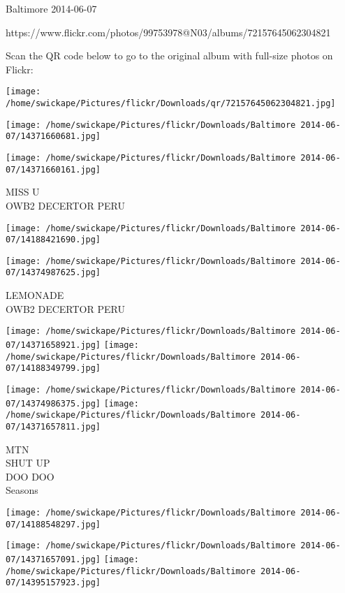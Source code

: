 \documentclass[10pt,letterpaper]{article}
\begin{document}
Baltimore 2014-06-07

https://www.flickr.com/photos/99753978@N03/albums/72157645062304821

Scan the QR code below to go to the original album with full-size photos on Flickr:

\texttt{[image: /home/swickape/Pictures/flickr/Downloads/qr/72157645062304821.jpg]}
\pagebreak

\texttt{[image: /home/swickape/Pictures/flickr/Downloads/Baltimore 2014-06-07/14371660681.jpg]}

\vspace{0.25in}
\texttt{[image: /home/swickape/Pictures/flickr/Downloads/Baltimore 2014-06-07/14371660161.jpg]}

MISS U\\
OWB2 DECERTOR PERU\\
\pagebreak

\texttt{[image: /home/swickape/Pictures/flickr/Downloads/Baltimore 2014-06-07/14188421690.jpg]}

\vspace{0.25in}
\texttt{[image: /home/swickape/Pictures/flickr/Downloads/Baltimore 2014-06-07/14374987625.jpg]}

LEMONADE\\
OWB2 DECERTOR PERU\\
\pagebreak

\texttt{[image: /home/swickape/Pictures/flickr/Downloads/Baltimore 2014-06-07/14371658921.jpg]}
\texttt{[image: /home/swickape/Pictures/flickr/Downloads/Baltimore 2014-06-07/14188349799.jpg]}

\texttt{[image: /home/swickape/Pictures/flickr/Downloads/Baltimore 2014-06-07/14374986375.jpg]}
\texttt{[image: /home/swickape/Pictures/flickr/Downloads/Baltimore 2014-06-07/14371657811.jpg]}

MTN\\
SHUT UP\\
DOO DOO\\
Seasons\\
\pagebreak

\texttt{[image: /home/swickape/Pictures/flickr/Downloads/Baltimore 2014-06-07/14188548297.jpg]}

\vspace{0.25in}
\texttt{[image: /home/swickape/Pictures/flickr/Downloads/Baltimore 2014-06-07/14371657091.jpg]}
\texttt{[image: /home/swickape/Pictures/flickr/Downloads/Baltimore 2014-06-07/14395157923.jpg]}
\end{document}
